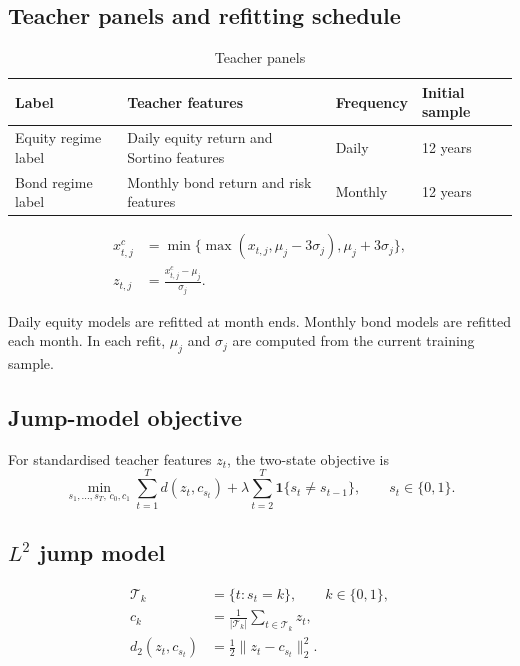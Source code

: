 \subsection{Teacher panels and refitting schedule}

\begin{table}[H]
\centering
\caption{Teacher panels}
\label{tab:app-teacher-panels}
\begin{tabular}{p{}p{}p{}p{}}
\toprule
Label & Teacher features & Frequency & Initial sample \\
\midrule
Equity regime label
& Daily equity return and Sortino features
& Daily
& 12 years \\

Bond regime label
& Monthly bond return and risk features
& Monthly
& 12 years \\
\bottomrule
\end{tabular}
\end{table}

\begin{align}
x^c_{t,j}
&=
\min\{\max(x_{t,j},\mu_j-3\sigma_j),\mu_j+3\sigma_j\}, \\
z_{t,j}
&=
\frac{x^c_{t,j}-\mu_j}{\sigma_j}.
\end{align}

Daily equity models are refitted at month ends. Monthly bond models are refitted each month. In each refit, \(\mu_j\) and \(\sigma_j\) are computed from the current training sample.

\subsection{Jump-model objective}

For standardised teacher features \(z_t\), the two-state objective is
\begin{equation}
\min_{s_1,\ldots,s_T,\,c_0,c_1}
\sum_{t=1}^{T} d(z_t,c_{s_t})
+
\lambda\sum_{t=2}^{T}\mathbf{1}\{s_t\neq s_{t-1}\},
\qquad
s_t\in\{0,1\}.
\label{eq:app-jump-objective}
\end{equation}

\subsection{\(L^2\) jump model}

\begin{align}
\mathcal{T}_k
&=
\{t:s_t=k\}, \qquad k\in\{0,1\}, \\
c_k
&=
\frac{1}{|\mathcal{T}_k|}
\sum_{t\in\mathcal{T}_k}z_t, \\
d_2(z_t,c_{s_t})
&=
\frac{1}{2}\|z_t-c_{s_t}\|_2^2.
\end{align}

